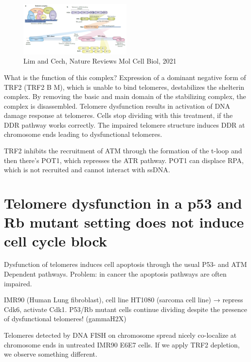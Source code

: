 \begin{figure}
\centering
\includegraphics[width=0.5\textwidth]{../_resources/Screen_Shot_2022-12-15_at_17-43-24.png}
\caption{Lim and Cech, Nature Reviews Mol Cell Biol, 2021}
\end{figure}

What is the function of this complex? Expression of a dominant negative
form of TRF2 (TRF2 B M), which is unable to bind telomeres, destabilizes
the shelterin complex. By removing the basic and main domain of the
stabilizing complex, the complex is disassembled. Telomere dysfunction
results in activation of DNA damage response at telomeres. Cells stop
dividing with this treatment, if the DDR pathway works correctly. The
impaired telomere structure induces DDR at chromosome ends leading to
dysfunctional telomeres.

TRF2 inhibits the recruitment of ATM through the formation of the t-loop
and then there's POT1, which represses the ATR pathway. POT1 can
displace RPA, which is not recruited and cannot interact with ssDNA.

\hypertarget{telomere-dysfunction-in-a-p53-and-rb-mutant-setting-does-not-induce-cell-cycle-block}{%
\section{Telomere dysfunction in a p53 and Rb mutant setting does not induce cell cycle block}\label{telomere-dysfunction-in-a-p53-and-rb-mutant-setting-does-not-induce-cell-cycle-block}}

Dysfunction of telomeres induces cell apoptosis through the usual P53-
and ATM Dependent pathways. Problem: in cancer the apoptosis pathways
are often impaired.

IMR90 (Human Lung fibroblast), cell line HT1080 (sarcoma cell line) →
repress Cdk6, activate Cdk1. P53/Rb mutant cells continue dividing
despite the presence of dysfunctional telomeres! (gammaH2X)

Telomeres detected by DNA FISH on chromosome spread nicely co-localize
at chromosome ends in untreated IMR90 E6E7 cells. If we apply TRF2
depletion, we observe something different.

